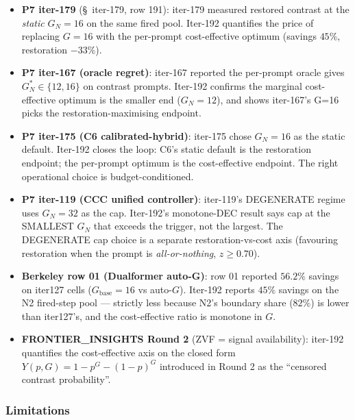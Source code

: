 \documentclass{article}
\begin{document}
\begin{itemize}
\item \textbf{P7 iter-179} (\S~iter-179, row 191): iter-179 measured
restored contrast at the \emph{static} $G_N = 16$ on the same fired
pool. Iter-192 quantifies the price of replacing $G = 16$ with the
per-prompt cost-effective optimum (savings $45\%$, restoration $-33\%$).
\item \textbf{P7 iter-167 (oracle regret)}: iter-167 reported the
per-prompt oracle gives $G_N^* \in \{12, 16\}$ on contrast prompts.
Iter-192 confirms the marginal cost-effective optimum is the smaller
end ($G_N = 12$), and shows iter-167's G=16 picks the
restoration-maximising endpoint.
\item \textbf{P7 iter-175 (C6 calibrated-hybrid)}: iter-175 chose
$G_N = 16$ as the static default. Iter-192 closes the loop: C6's
static default is the restoration endpoint; the per-prompt optimum is
the cost-effective endpoint. The right operational choice is
budget-conditioned.
\item \textbf{P7 iter-119 (CCC unified controller)}: iter-119's
DEGENERATE regime uses $G_N = 32$ as the cap. Iter-192's monotone-DEC
result says cap at the SMALLEST $G_N$ that exceeds the trigger, not
the largest. The DEGENERATE cap choice is a separate
restoration-vs-cost axis (favouring restoration when the prompt is
\emph{all-or-nothing}, $z \ge 0.70$).
\item \textbf{Berkeley row 01 (Dualformer auto-G)}: row 01 reported
$56.2\%$ savings on iter127 cells ($G_{\mathrm{base}}{=}16$ vs
auto-$G$). Iter-192 reports $45\%$ savings on the N2 fired-step pool
--- strictly less because N2's boundary share ($82\%$) is lower than
iter127's, and the cost-effective ratio is monotone in $G$.
\item \textbf{FRONTIER\_INSIGHTS Round 2} (ZVF = signal availability):
iter-192 quantifies the cost-effective axis on the closed form
$Y(p, G) = 1 - p^G - (1-p)^G$ introduced in Round 2 as the
``censored contrast probability''.
\end{itemize}

\subsubsection*{Limitations}
\end{document}
